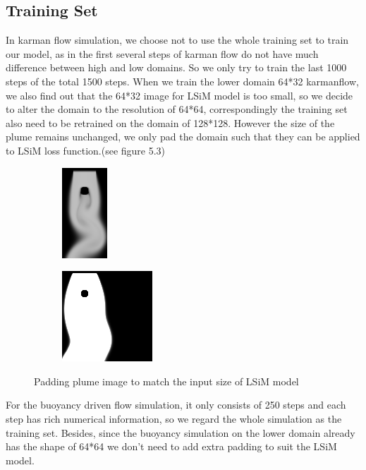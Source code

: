 \documentclass[a4paper,12pt,twoside]{report}
\begin{document}
\subsection{Training Set}
In karman flow simulation, we choose not to use the whole training set to train our model, as in the first several steps of karman flow do not have much difference between high and low domains. So we only try to train the last 1000 steps of the total 1500 steps. When we train the lower domain 64*32 karmanflow, we also find out that the 64*32 image for LSiM model is too small, so we decide to alter the domain to the resolution of 64*64, correspondingly the training set also need to be retrained on the domain of 128*128. However the size of the plume remains unchanged, we only pad the domain such that they can be applied to LSiM loss function.(see figure 5.3)
\begin{figure}
\centering
\begin{subfigure}{0.4\textwidth}
  \centering
  \includegraphics[scale=1]{nonpad_karmanflow.png}
  \caption{}
\end{subfigure}
\begin{subfigure}{0.4\textwidth}
  \centering
  \includegraphics[scale=1]{pad_karmanflow.png}
  \caption{}
\end{subfigure}
\caption{Padding plume image to match the input size of LSiM model}
\end{figure}
For the buoyancy driven flow simulation, it only consists of 250 steps and each step has rich numerical information, so we regard the whole simulation as the training set. Besides, since the buoyancy simulation on the lower domain already has the shape of 64*64 we don't need to add extra padding to suit the LSiM model.
\end{document}
